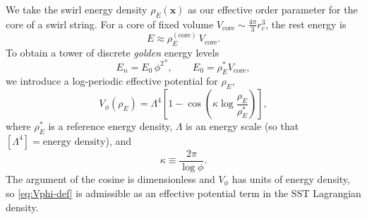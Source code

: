 \documentclass[10pt,reprint,aps,onecolumn,nofootinbib]{revtex4-2}
\newcommand{\rhoE}{\rho_{\!E}}                           %
\newcommand{\rc}{r_c}                                    %
\newcommand{\Golden}{\phi}
\newcommand{\GoldenSq}{\phi^{2}}
\providecommand{\rc}{r_c}
\begin{document}
        We take the swirl energy density $\rhoE(\boldsymbol{x})$ as our effective
        order parameter for the core of a swirl string. For a core of fixed volume
        $V_{\text{core}} \sim \tfrac{4\pi}{3}\rc^{3}$, the rest energy is
        \begin{equation}
            E \approx \rhoE^{(\text{core})}\,V_{\text{core}}.
        \end{equation}
        To obtain a tower of discrete \emph{golden} energy levels
        \begin{equation}
            E_n = E_0\,\GoldenSq^{\,n},
            \qquad
            E_0 = \rhoE^{*} V_{\text{core}},
        \end{equation}
        we introduce a log-periodic effective potential for $\rhoE$,
        \begin{equation}
            V_{\Golden}(\rhoE)
            =
            \Lambda^4
            \left[
                1 - \cos\!\left(
                              \kappa \log\frac{\rhoE}{\rhoE^{*}}
            \right)
            \right],
            \label{eq:Vphi-def}
        \end{equation}
        where $\rhoE^{*}$ is a reference energy density, $\Lambda$ is an energy
        scale (so that $[\Lambda^4]=\text{energy density}$), and
        \begin{equation}
            \kappa \equiv \frac{2\pi}{\log\Golden} .
        \end{equation}
        The argument of the cosine is dimensionless and $V_{\Golden}$ has units of
        energy density, so \eqref{eq:Vphi-def} is admissible as an effective
        potential term in the SST Lagrangian density.
\end{document}
